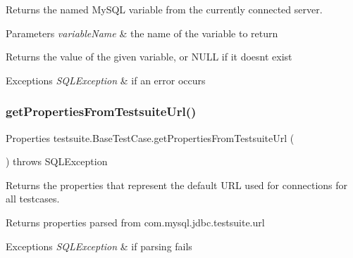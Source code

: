 Returns the named My\+S\+QL variable from the currently connected server.


\begin{DoxyParams}{Parameters}
{\em variable\+Name} & the name of the variable to return\\
\hline
\end{DoxyParams}
\begin{DoxyReturn}{Returns}
the value of the given variable, or N\+U\+LL if it doesn\textquotesingle{}t exist
\end{DoxyReturn}

\begin{DoxyExceptions}{Exceptions}
{\em S\+Q\+L\+Exception} & if an error occurs \\
\hline
\end{DoxyExceptions}
\mbox{\label{classtestsuite_1_1_base_test_case_ab63fc653810c4915e190196e7b3d6e6c}} 
\subsubsection{\texorpdfstring{get\+Properties\+From\+Testsuite\+Url()}{getPropertiesFromTestsuiteUrl()}}
{\footnotesize\ttfamily Properties testsuite.\+Base\+Test\+Case.\+get\+Properties\+From\+Testsuite\+Url (\begin{DoxyParamCaption}{ }\end{DoxyParamCaption}) throws S\+Q\+L\+Exception\hspace{0.3cm}{\ttfamily [protected]}}

Returns the properties that represent the default U\+RL used for connections for all testcases.

\begin{DoxyReturn}{Returns}
properties parsed from com.\+mysql.\+jdbc.\+testsuite.\+url
\end{DoxyReturn}

\begin{DoxyExceptions}{Exceptions}
{\em S\+Q\+L\+Exception} & if parsing fails \\
\hline
\end{DoxyExceptions}
\mbox{\label{classtestsuite_1_1_base_test_case_a30a8a94757291826321a07c5b10a6233}} 

